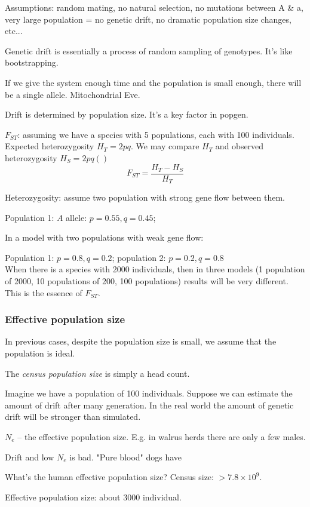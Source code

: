 \documentclass[main.tex]{subfiles}
\begin{document}
Assumptions: random mating, no natural selection, no mutations between A \& a, very large population = no genetic drift, no dramatic population size changes, etc...
 
Genetic drift is essentially a process of random sampling of genotypes.
It's like bootstrapping.

If we give the system enough time and the population is small enough, there will be a single allele.
Mitochondrial Eve.


Drift is determined by population size.
It's a key factor in popgen.

$F_{ST}$: assuming we have a species with 5 populations, each with 100 individuals.
Expected heterozygosity $ H_T = 2pq $.
We may compare $H_T$ and observed heterozygosity $H_S = 2pq() $ %
\[ F_{ST}  = \frac{H_T - H_S}{H_T}\]

Heterozygosity: assume two population with strong gene flow between them.

Population 1: $ A $ allele: $ p = 0.55, q = 0.45 $;


In a model with two populations with weak gene flow: 

Population 1: $ p=0.8, q=0.2 $; population 2: $ p=0.2, q=0.8 $ \\

When there is a species with 2000 individuals, then in three models (1 population of 2000, 10 populations of 200, 100 populations) results will be very different.
This is the essence of $ F_{ST} $.

\subsubsection{Effective population size}

In previous cases, despite the population size is small, we assume that the population is ideal.

The \emph{census population size} is simply a head count.

Imagine we have a population of 100 individuals.
Suppose we can estimate the amount of drift after many generation.
In the real world the amount of genetic drift will be stronger than simulated.

$ N_e $ -- the effective population size.
E.g. in walrus herds there are only a few males.

Drift and low $ N_e $ is bad.
"Pure blood" dogs have

What's the human effective population size?
Census size: $ > 7.8 \times 10^9 $.

Effective population size: about 3000 individual.
\end{document}

